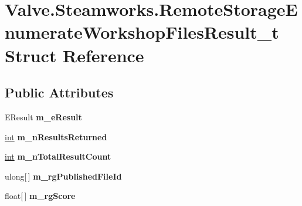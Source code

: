 \hypertarget{structValve_1_1Steamworks_1_1RemoteStorageEnumerateWorkshopFilesResult__t}{}\section{Valve.\+Steamworks.\+Remote\+Storage\+Enumerate\+Workshop\+Files\+Result\+\_\+t Struct Reference}
\label{structValve_1_1Steamworks_1_1RemoteStorageEnumerateWorkshopFilesResult__t}
\subsection*{Public Attributes}
\begin{DoxyCompactItemize}
\item 
\hypertarget{structValve_1_1Steamworks_1_1RemoteStorageEnumerateWorkshopFilesResult__t_a9918c1875dd01cacae927a7e6804f2c3}{}E\+Result {\bfseries m\+\_\+e\+Result}\label{structValve_1_1Steamworks_1_1RemoteStorageEnumerateWorkshopFilesResult__t_a9918c1875dd01cacae927a7e6804f2c3}

\item 
\hypertarget{structValve_1_1Steamworks_1_1RemoteStorageEnumerateWorkshopFilesResult__t_a1be72fa2652b748370e4fef33010d433}{}\hyperlink{SDL__thread_8h_a6a64f9be4433e4de6e2f2f548cf3c08e}{int} {\bfseries m\+\_\+n\+Results\+Returned}\label{structValve_1_1Steamworks_1_1RemoteStorageEnumerateWorkshopFilesResult__t_a1be72fa2652b748370e4fef33010d433}

\item 
\hypertarget{structValve_1_1Steamworks_1_1RemoteStorageEnumerateWorkshopFilesResult__t_a38239c977b9a71c8962a8ccd2da6aa4d}{}\hyperlink{SDL__thread_8h_a6a64f9be4433e4de6e2f2f548cf3c08e}{int} {\bfseries m\+\_\+n\+Total\+Result\+Count}\label{structValve_1_1Steamworks_1_1RemoteStorageEnumerateWorkshopFilesResult__t_a38239c977b9a71c8962a8ccd2da6aa4d}

\item 
\hypertarget{structValve_1_1Steamworks_1_1RemoteStorageEnumerateWorkshopFilesResult__t_a06a2d2595f0bf7b3c66bb1df672820af}{}ulong\mbox{[}$\,$\mbox{]} {\bfseries m\+\_\+rg\+Published\+File\+Id}\label{structValve_1_1Steamworks_1_1RemoteStorageEnumerateWorkshopFilesResult__t_a06a2d2595f0bf7b3c66bb1df672820af}

\item 
\hypertarget{structValve_1_1Steamworks_1_1RemoteStorageEnumerateWorkshopFilesResult__t_aa973158b0041031437865d7cc98dbfc6}{}float\mbox{[}$\,$\mbox{]} {\bfseries m\+\_\+rg\+Score}\label{structValve_1_1Steamworks_1_1RemoteStorageEnumerateWorkshopFilesResult__t_aa973158b0041031437865d7cc98dbfc6}


\end{DoxyCompactItemize}
